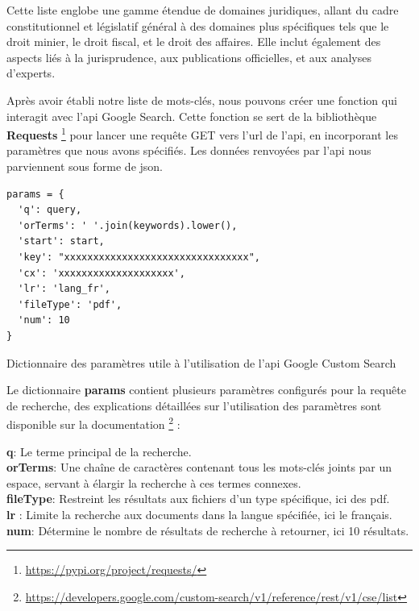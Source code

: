 Cette liste englobe une gamme étendue de domaines juridiques, allant du cadre constitutionnel et législatif général à des domaines plus spécifiques tels que le droit minier, le droit fiscal, et le droit des affaires. Elle inclut également des aspects liés à la jurisprudence, aux publications officielles, et aux analyses d'experts.

Après avoir établi notre liste de mots-clés, nous pouvons créer une fonction qui interagit avec l'\acs{api} Google Search. Cette fonction se sert de la bibliothèque \textbf{Requests} \footnote{\href{https://pypi.org/project/requests/}{https://pypi.org/project/requests/}} pour lancer une requête GET vers l'\acs{url} de l'\acs{api}, en incorporant les paramètres que nous avons spécifiés. Les données renvoyées par l'\acs{api} nous parviennent sous forme de \acs{json}.

\begin{listing}[!ht]
\begin{verbatim}
params = {
  'q': query,
  'orTerms': ' '.join(keywords).lower(),
  'start': start,
  'key': "xxxxxxxxxxxxxxxxxxxxxxxxxxxxxxxx",
  'cx': 'xxxxxxxxxxxxxxxxxxxx',
  'lr': 'lang_fr',
  'fileType': 'pdf',
  'num': 10
}
\end{verbatim}
\caption{Dictionnaire des paramètres utile à l'utilisation de l'\acs{api} Google Custom Search}
\label{appendix:code:python:search-google-params}
\end{listing}

Le dictionnaire \textbf{params} contient plusieurs paramètres configurés pour la requête de recherche, des explications détaillées sur l'utilisation des paramètres sont disponible sur la documentation \footnote{\href{https://developers.google.com/custom-search/v1/reference/rest/v1/cse/list}{https://developers.google.com/custom-search/v1/reference/rest/v1/cse/list}} :

\textbf{q}: Le terme principal de la recherche. \\
\textbf{orTerms}: Une chaîne de caractères contenant tous les mots-clés joints par un espace, servant à élargir la recherche à ces termes connexes. \\
\textbf{fileType}: Restreint les résultats aux fichiers d'un type spécifique, ici des \acs{pdf}. \\
\textbf{lr} : Limite la recherche aux documents dans la langue spécifiée, ici le français. \\
\textbf{num}: Détermine le nombre de résultats de recherche à retourner, ici 10 résultats.

